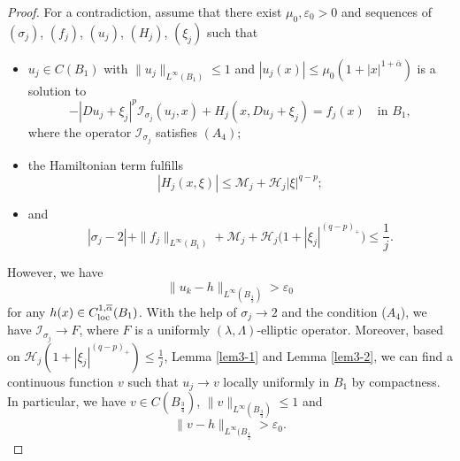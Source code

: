 \documentclass[11pt,reqno]{amsart}
\numberwithin{equation}{section}
\begin{document}
\begin{proof}
For a contradiction, assume that there exist $\mu_0,\varepsilon_0>0$ and sequences of $(\sigma_j)$, $(f_j)$, $(u_j)$, $(H_j)$, $(\xi_j)$ such that
\begin{itemize}
  \item[(i)]
  $u_j\in C(B_1)$ with $\|u_j\|_{L^\infty(B_1)}\leq 1$ and $|u_j(x)|\le\mu_0(1+|x|^{1+\overline{\alpha}})$ is a solution to
      \begin{equation}
      \label{4-1-1}
      -|Du_j+\xi_j|^p\mathcal{I}_{\sigma_j}(u_j,x)+H_j(x,Du_j+\xi_j)=f_j(x)  \quad \text{in } B_1,
      \end{equation}
      where the operator $\mathcal{I}_{\sigma_j}$ satisfies $(A_4)$;
  \item[(ii)] the Hamiltonian term fulfills
  \begin{equation}\label{4-1-2}
  |H_j(x,\xi)|\le \mathcal{M}_j+\mathcal{H}_j|\xi|^{q-p};
  \end{equation}
  \item[(iii)] and
  \begin{equation}
  \label{4-1-3}
|\sigma_j-2|+\|f_j\|_{L^\infty(B_1)}+\mathcal{M}_j+\mathcal{H}_j\bigl(1+|\xi_j|^{(q-p)_+}\bigr)\leq \frac{1}{j}.
\end{equation}

\end{itemize}
However, we have
$$
\|u_k-h\|_{L^\infty(B_{\frac12})}>\varepsilon_0
$$
for any $h(x)\in C^{1,\overline{\alpha}}_{\rm loc}(B_1)$. With the help of $\sigma_j\rightarrow2$ and the condition ($A_4$), we have $\mathcal{I}_{\sigma_j}\rightarrow F$, where $F$ is a uniformly $(\lambda,\Lambda)$-elliptic operator. Moreover, based on $\mathcal{H}_j\left(1+|\xi_j|^{(q-p)_+}\right)\leq \frac{1}{j}$, Lemma \ref{lem3-1} and Lemma \ref{lem3-2}, we can find a continuous function $v$ such that $u_j\rightarrow v$ locally uniformly in $B_1$ by compactness. In particular, we have
$v\in C(B_{\frac34})$, $\|v\|_{L^\infty(B_{\frac34})}\leq1$ and
\begin{equation}
\label{4-1-4}
\|v-h\|_{L^\infty(B_{\frac12}}>\varepsilon_0.
\end{equation}


\end{proof}
\end{document}
